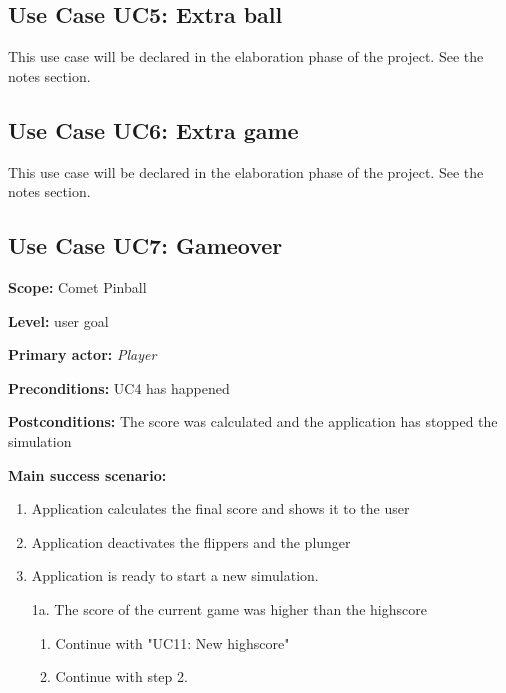 \documentclass[fontsize=12pt,
               paper=a4,
               twoside=false,
               parskip=half,
               ]{scrartcl}
\begin{document}


\subsection{Use Case UC5: Extra ball}

This use case will be declared in the elaboration phase of the project. See the notes section.


\subsection{Use Case UC6: Extra game}

This use case will be declared in the elaboration phase of the project. See the notes section.


\subsection{Use Case UC7: Gameover}

\textbf{\textsf{Scope:}} Comet Pinball

\textbf{\textsf{Level:}} user goal

\textbf{\textsf{Primary actor:}} \emph{Player}

\textbf{\textsf{Preconditions:}} UC4 has happened

\textbf{\textsf{Postconditions:}} The score was calculated and the application has stopped the simulation

\textbf{\textsf{Main success scenario:}}

\begin{enumerate}[leftmargin=3em]
	\item Application calculates the final score and shows it to the user
	\item Application deactivates the flippers and the plunger
	\item Application is ready to start a new simulation.
\end{enumerate}


\begin{itemize}[leftmargin=3em]
	\item[1a.]  The score of the current game was higher than the highscore
	\begin{enumerate}
		\item Continue with "UC11: New highscore"
		\item Continue with step 2.
	\end{enumerate}
\end{itemize}
\end{document}
